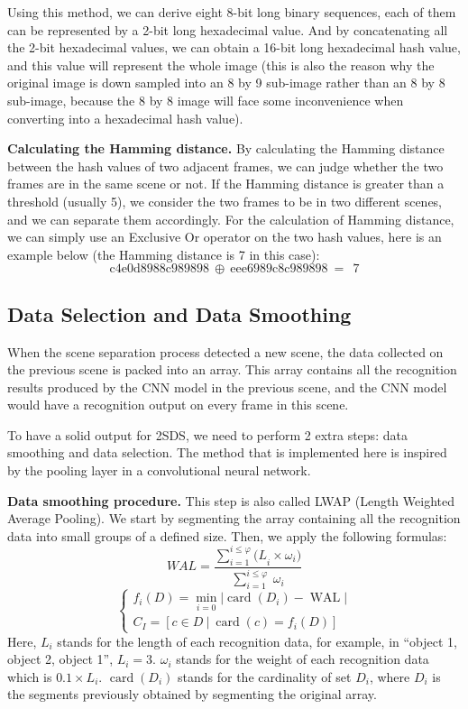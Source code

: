 \documentclass[
twocolumn,
]{ceurart}
\begin{document}
Using this method, we can derive eight 8-bit long binary sequences, each of them can be represented by a 2-bit long hexadecimal value. And by concatenating all the 2-bit hexadecimal values, we can obtain a 16-bit long hexadecimal hash value, and this value will represent the whole image (this is also the reason why the original image is down sampled into an 8 by 9 sub-image rather than an 8 by 8 sub-image, because the 8 by 8 image will face some inconvenience when converting into a hexadecimal hash value). 

\textbf{Calculating the Hamming distance.} By calculating the Hamming distance between the hash values of two adjacent frames, we can judge whether the two frames are in the same scene or not. If the Hamming distance is greater than a threshold (usually 5), we consider the two frames to be in two different scenes, and we can separate them accordingly. For the calculation of Hamming distance, we can simply use an Exclusive Or operator on the two hash values, here is an example below (the Hamming distance is 7 in this case):
\begin{equation}
  \text{c4e0d8988c989898}\ \oplus\ \text{eee6989c8c989898}\ =\ \ 7
\end{equation}

\subsection{Data Selection and Data Smoothing}
When the scene separation process detected a new scene, the data collected on the previous scene is packed into an array. This array contains all the recognition results produced by the CNN model in the previous scene, and the CNN model would have a recognition output on every frame in this scene.

To have a solid output for 2SDS, we need to perform 2 extra steps: data smoothing and data selection. The method that is implemented here is inspired by the pooling layer in a convolutional neural network.

\textbf{Data smoothing procedure.} This step is also called LWAP (Length Weighted Average Pooling). We start by segmenting the array containing all the recognition data into small groups of a defined size. Then, we apply the following formulas:
\begin{equation}
  WAL=\frac{\sum_{i=1}^{i\le\varphi}{{(L}_i\times\omega_i)}}{\sum_{i=1}^{i\le\varphi}{\ \omega}_i}
\end{equation}
\begin{equation}
  \left\{\begin{array}{l}
    f_i(D)=\min_{i=0}{|\operatorname{card}(D_i)-\operatorname{WAL}|}\\
    C_{I}=[c\in D\ |\ \operatorname{card}(c)=f_i(D)]
  \end{array}\right.
\end{equation}
Here, $L_i$ stands for the length of each recognition data, for example, in “object 1, object 2, object 1”, $L_i=3$. $\omega_i$ stands for the weight of each recognition data which is $0.1\times L_i$. $\operatorname{card}(D_i)$ stands for the cardinality of set  $D_i$, where $D_i$ is the segments previously obtained by segmenting the original array.
\end{document}
